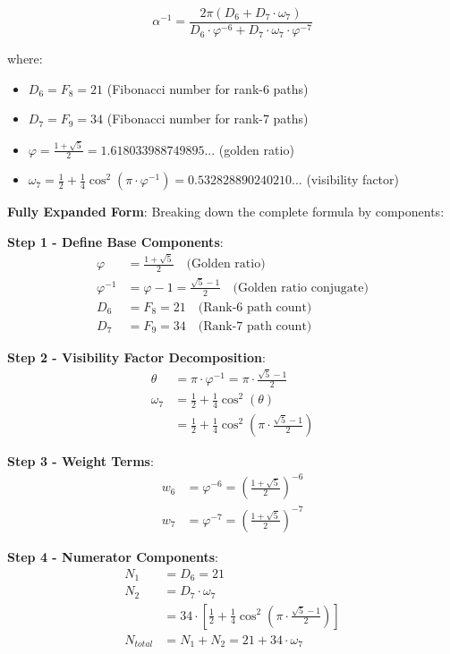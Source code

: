 \documentclass[%
 reprint,
 amsmath,amssymb,
 aps,
 prd,
 10pt,
 nofootinbib,      %
 longbibliography  %
]{revtex4-2}
\theoremstyle{definition}
\theoremstyle{remark}
\begin{document}
\begin{equation}
\boxed{
\alpha^{-1} = \frac{2\pi \left( D_6 + D_7 \cdot \omega_7 \right)}{D_6 \cdot \varphi^{-6} + D_7 \cdot \omega_7 \cdot \varphi^{-7}}
}
\end{equation}

where:
\begin{itemize}
\item $D_6 = F_8 = 21$ (Fibonacci number for rank-6 paths)
\item $D_7 = F_9 = 34$ (Fibonacci number for rank-7 paths)
\item $\varphi = \frac{1 + \sqrt{5}}{2} = 1.618033988749895...$ (golden ratio)
\item $\omega_7 = \frac{1}{2} + \frac{1}{4}\cos^2(\pi \cdot \varphi^{-1}) = 0.532828890240210...$ (visibility factor)
\end{itemize}

\textbf{Fully Expanded Form}: Breaking down the complete formula by components:

\textbf{Step 1 - Define Base Components}:
\begin{align}
\varphi &= \frac{1+\sqrt{5}}{2} \quad \text{(Golden ratio)} \\
\varphi^{-1} &= \varphi - 1 = \frac{\sqrt{5}-1}{2} \quad \text{(Golden ratio conjugate)} \\
D_6 &= F_8 = 21 \quad \text{(Rank-6 path count)} \\
D_7 &= F_9 = 34 \quad \text{(Rank-7 path count)}
\end{align}

\textbf{Step 2 - Visibility Factor Decomposition}:
\begin{align}
\theta &= \pi \cdot \varphi^{-1} = \pi \cdot \frac{\sqrt{5}-1}{2} \\
\omega_7 &= \frac{1}{2} + \frac{1}{4}\cos^2(\theta) \\
&= \frac{1}{2} + \frac{1}{4}\cos^2\left(\pi \cdot \frac{\sqrt{5}-1}{2}\right)
\end{align}

\textbf{Step 3 - Weight Terms}:
\begin{align}
w_6 &= \varphi^{-6} = \left(\frac{1+\sqrt{5}}{2}\right)^{-6} \\
w_7 &= \varphi^{-7} = \left(\frac{1+\sqrt{5}}{2}\right)^{-7}
\end{align}

\textbf{Step 4 - Numerator Components}:
\begin{align}
N_1 &= D_6 = 21 \\
N_2 &= D_7 \cdot \omega_7 \\
&= 34 \cdot \left[\frac{1}{2} + \frac{1}{4}\cos^2\left(\pi \cdot \frac{\sqrt{5}-1}{2}\right)\right] \\
N_{total} &= N_1 + N_2 = 21 + 34 \cdot \omega_7
\end{align}
\end{document}
